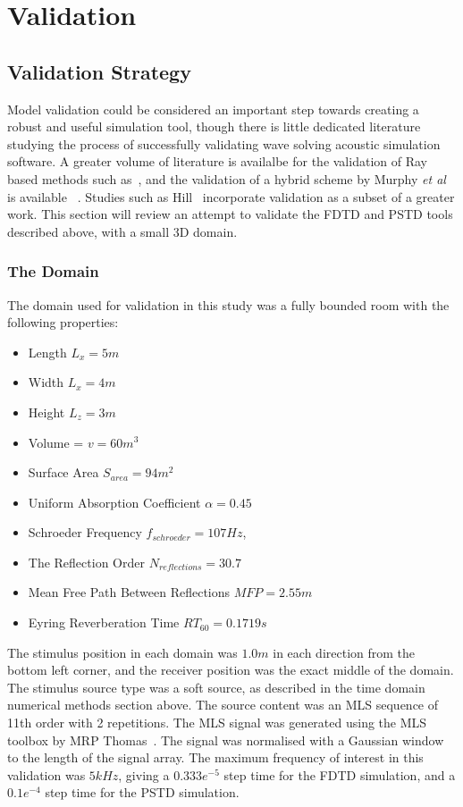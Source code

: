 
\chapter{Validation}
\section{Validation Strategy}
Model validation could be considered an important step towards creating a robust and useful simulation tool, though there is little dedicated literature studying the process of successfully validating wave solving acoustic simulation software. A greater volume of literature is availalbe for the validation of Ray based methods such as~\cite{Ahnert2005,Tsingos2002,Foteinou2010}, and the validation of a hybrid scheme by Murphy \textit{et al} is available ~\cite{Southern2013}. Studies such as Hill~\cite{Hill2012} incorporate validation as a subset of a greater work. This section will review an attempt to validate the FDTD and PSTD tools described above, with a small 3D domain.\\

\subsection{The Domain}
The domain used for validation in this study was a fully bounded room with the following properties:\\

\begin{itemize}
\item Length $L_x = 5m$
\item Width $L_x = 4m$
\item Height $L_z = 3m$
\item Volume = $ v = 60m^3$
\item Surface Area $S_{area} = 94m^2$
\item Uniform Absorption Coefficient $\alpha = 0.45 $
\item Schroeder Frequency  $f_{schroeder} = 107Hz $,
\item The Reflection Order $N_{reflections} = 30.7$
\item Mean Free Path Between Reflections $MFP = 2.55m$
\item Eyring Reverberation Time $RT_{60} = 0.1719s $
\end{itemize}

The stimulus position in each domain was $1.0m$ in each direction from the bottom left corner, and the receiver position was the exact middle of the domain. The stimulus source type was a soft source, as described in the time domain numerical methods section above. 
The source content was an MLS sequence of 11th order with 2 repetitions. The MLS signal was generated using the MLS toolbox by MRP Thomas~\cite{Mrt2008}. The signal was normalised with a Gaussian window to the length of the signal array. The maximum frequency of interest in this validation was $5kHz$, giving a $0.333e^{-5}$ step time for the FDTD simulation, and a $0.1e^{-4}$ step time for the PSTD simulation.

